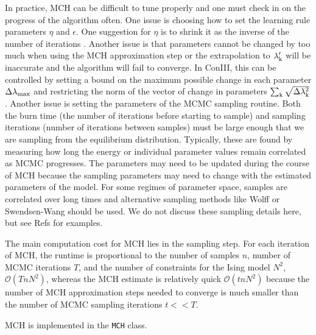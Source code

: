 \documentclass[aps,prl,twocolumn,nofootinbib]{revtex4-1}
\begin{document}
In practice, MCH can be difficult to tune properly and one must check in on the progress of the algorithm often. One issue is choosing how to set the learning rule parameters $\eta$ and $\epsilon$. One suggestion for $\eta$ is to shrink it as the inverse of the number of iterations \cite{Tkacik:2006vq}. Another issue is that parameters cannot be changed by too much when using the MCH approximation step or the extrapolation to $\lambda_{\rm k}'$ will be inaccurate and the algorithm will fail to converge. In ConIII, this can be controlled by setting a bound on the maximum possible change in each parameter  $\Delta\lambda_{\rm max}$ and restricting the norm of the vector of change in parameters $\sum_{\rm k} \sqrt{\Delta\lambda_{\rm k}^2}$. Another issue is setting the parameters of the MCMC sampling routine. Both the burn time (the number of iterations before starting to sample) and sampling iterations (number of iterations between samples) must be large enough that we are sampling from the equilibrium distribution.  Typically, these are found by measuring how long the energy or individual parameter values remain correlated as MCMC progresses. The parameters may need to be updated during the course of MCH because the sampling parameters may need to change with the estimated parameters of the model. For some regimes of parameter space, samples are correlated over long times and alternative sampling methods like Wolff or Swendsen-Wang should be used.
We do not discuss these sampling details here, but see Refs \cite{MacKay:2005wc,Newman:1999wu} for examples.

The main computation cost for MCH lies in the sampling step. For each iteration of MCH, the runtime is proportional to the number of samples $n$, number of MCMC iterations $T$, and the number of constraints for the Ising model $N^2$,
$\mathcal{O}(T n N^2)$, whereas the MCH estimate is relatively quick $\mathcal{O}(t n N^2)$ because the number of MCH approximation steps needed to converge is much smaller than the number of MCMC sampling iterations $t<<T$.

MCH is implemented in the {\tt MCH} class.
\end{document}
